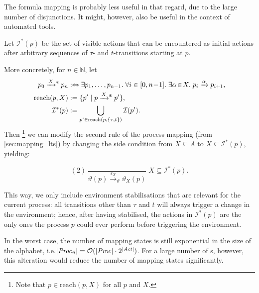\begin{isabellebody}
\begin{isamarkuptext}
The formula mapping is probably less useful in that regard, due to the large number of disjunctions. It might, however, also be useful in the context of automated tools.%
\end{isamarkuptext}\isamarkuptrue%
%
\isadelimdocument
%
\endisadelimdocument
%
\isatagdocument
%
\isamarkuptrue%
%
\endisatagdocument
{\isafolddocument}%
%
\isadelimdocument
%
\endisadelimdocument
%
\begin{isamarkuptext}%
Let $\mathcal{I}^*(p)$ be the set of visible actions that can be encountered as initial actions after arbitrary sequences of $\tau$- and $t$-transitions starting at $p$.

More concretely, for $n \in \mathbb{N}$, let 
\begin{align*}
    p_0 \xrightarrow{X}\!\!\raisebox{1pt}{*}\; p_n &:\Leftrightarrow \exists p_1,\dots,p_{n-1} .\;
    \forall i \in [0,n\!-\!1] .\; \exists \alpha\!\in\!X .\; p_i \xrightarrow{\alpha} p_{i+1}, \\
    \text{reach}(p,X) &:= \{ p' \mid p \xrightarrow{X}\!\!\raisebox{1pt}{*}\; p' \}, \\
    \mathcal{I}^*(p) &:= \bigcup_{p' \in \text{reach}(p,\{\tau,t\})} \mathcal{I}(p').
\end{align*}
Then%
\footnote{Note that $p \in \text{reach}(p,X)$ for all $p$ and $X$.}
we can modify the second rule of the process mapping (from \cref{sec:mapping_lts}) by changing the side condition from $X \subseteq A$ to $X \subseteq \mathcal{I}^*(p)$, yielding:

$$
(2)\,\frac{}{\vartheta(p) \xrightarrow{\varepsilon_X}_\vartheta \vartheta_X(p)} \; X \subseteq \mathcal{I}^*(p).
$$

This way, we only include environment stabilisations that are relevant for the current process: all transitions other than $\tau$ and $t$ will always trigger a change in the environment; hence, after having stabilised, the actions in $\mathcal{I}^*(p)$ are the only ones the process $p$ could ever perform before triggering the environment.

In the worst case, the number of mapping states is still exponential in the size of the alphabet, i.e.\@ $|\mathit{Proc}_\vartheta| = \mathcal{O}(|\mathit{Proc}| \cdot 2^{|\mathit{Act}|})$. For a large number of \LTSt{}s, however, this alteration would reduce the number of mapping states significantly.


\end{isamarkuptext}
\end{isabellebody}
